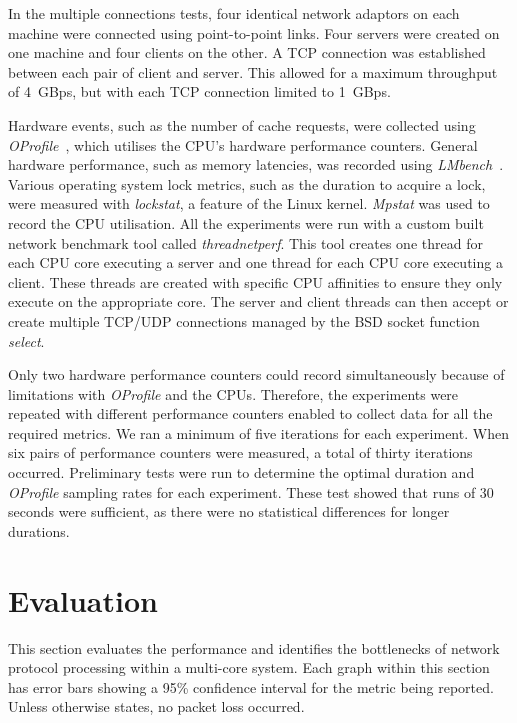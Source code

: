 \documentclass[conference, compsoc]{IEEEtran}
\begin{document}
In the multiple connections tests, four identical network adaptors on each machine were connected using point-to-point links. Four servers were created on one machine and four clients on the other. A TCP connection was established between each pair of client and server. This allowed for a maximum throughput of 4~GBps, but with each TCP connection limited to 1~GBps.

Hardware events, such as the number of cache requests, were collected using \emph{OProfile}~\cite{misc/oprofile}, which utilises the CPU's hardware performance counters. General hardware performance, such as memory latencies, was recorded using \emph{LMbench}~\cite{misc/lmbench}. Various operating system lock metrics, such as the duration to acquire a lock, were measured with \emph{lockstat}, a feature of the Linux kernel. \emph{Mpstat} was used to record the CPU utilisation. All the experiments were run with a custom built network benchmark tool called \emph{threadnetperf}. This tool creates one thread for each CPU core executing a server and one thread for each CPU core executing a client. These threads are created with specific CPU affinities to ensure they only execute on the appropriate core. The server and client threads can then accept or create multiple TCP/UDP connections managed by the BSD socket function \emph{select}.

Only two hardware performance counters could record simultaneously because of limitations with \emph{OProfile} and the CPUs. Therefore, the experiments were repeated with different performance counters enabled to collect data for all the required metrics. We ran a minimum of five iterations for each experiment. When six pairs of performance counters were measured, a total of thirty iterations occurred. Preliminary tests were run to determine the optimal duration and \emph{OProfile} sampling rates for each experiment. These test showed that runs of 30 seconds were sufficient, as there were no statistical differences for longer durations.

\section{Evaluation}
\label{sect:evaul}
This section evaluates the performance and identifies the bottlenecks of network protocol processing within a multi-core system. Each graph within this section has error bars showing a 95\% confidence interval for the metric being reported. Unless otherwise states, no packet loss occurred.
\end{document}
